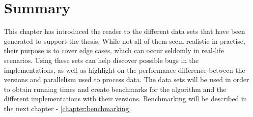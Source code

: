 
\section*{Summary}
This chapter has introduced the reader to the different data sets that have been generated to support the thesis. While not all of them seem realistic in practise, their purpose is to cover edge cases, which can occur seldomly in real-life scenarios. Using these sets can help discover possible bugs in the implementations, as well as highlight on the performance difference between the versions and parallelism used to process data. The data sets will be used in order to obtain running times and create benchmarks for the algorithm and the different implementations with their versions. Benchmarking will be described in the next chapter - \ref{chapter:benchmarking}.